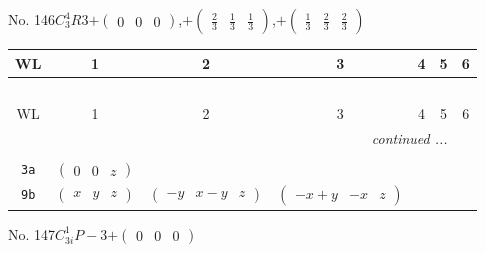 \documentclass[fleqn,9pt,landscape]{jsarticle}
\begin{document}
\newpage
No. 146\quad$C_{3}^{4}$\quad$R3$\quad[ trigonal ]\quad$+\begin{pmatrix} 0 & 0 & 0 \end{pmatrix}$,\quad $+\begin{pmatrix} \frac{2}{3} & \frac{1}{3} & \frac{1}{3} \end{pmatrix}$,\quad $+\begin{pmatrix} \frac{1}{3} & \frac{2}{3} & \frac{2}{3} \end{pmatrix}$
\begin{center}
\renewcommand{\arraystretch}{1.2}
\begin{longtable}{ccccccc}
 \hline \hline
WL & 1 & 2 & 3 & 4 & 5 & 6 \\ \hline \endfirsthead

\multicolumn{6}{l}{\tablename\ \thetable{}} \\
 \hline \hline
WL & 1 & 2 & 3 & 4 & 5 & 6 \\ \hline \endhead

 \hline \hline
\multicolumn{6}{r}{\footnotesize\it continued ...} \\ \endfoot

 \hline \hline
\multicolumn{6}{r}{} \\ \endlastfoot

{\tt 3a} & $ \begin{pmatrix} 0 & 0 & z \end{pmatrix} $ & $  $ & $  $ \\ \hline
{\tt 9b} & $ \begin{pmatrix} x & y & z \end{pmatrix} $ & $ \begin{pmatrix} - y & x - y & z \end{pmatrix} $ & $ \begin{pmatrix} - x + y & - x & z \end{pmatrix} $ \\
\end{longtable}
\end{center}
\newpage
No. 147\quad$C_{3i}^{1}$\quad$P-3$\quad[ trigonal ]\quad$+\begin{pmatrix} 0 & 0 & 0 \end{pmatrix}$
\end{document}
